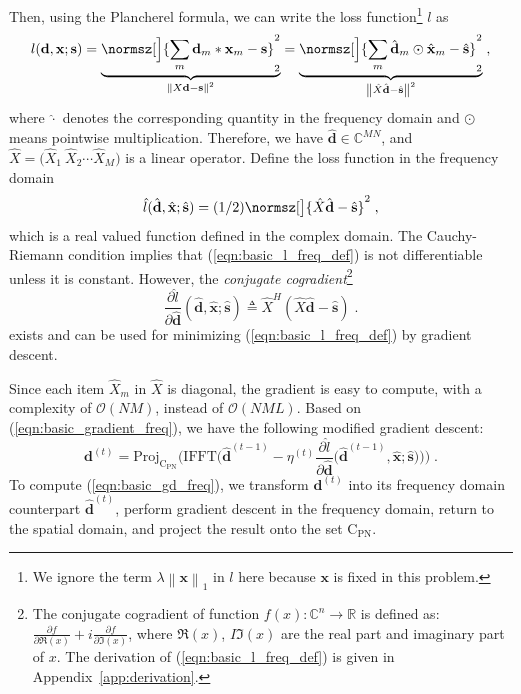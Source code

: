 \documentclass[final]{siamart1116}
\newcommand{\mb}[1]{\mathbf{#1}}
\providecommand{\norm}[1]{\left\lVert#1\right\rVert}
\def \co {\mathcal{O}}
\def \R  {\mathbb{R}}
\def \C  {\mathbb{C}}
\begin{document}
Then, using the Plancherel formula, we can write the loss function\footnote{We ignore the term $\lambda\norm{\mb{x}}_1$ in $l$ here because $\mb{x}$ is fixed in this problem.} $l$ as
\vspace{-1mm}
\begin{equation}
\label{eqn:basic_l_freq}
l(\mb{d},\mb{x};\mb{s}) = \underbrace{ \normsz[\Big]{\sum_m \mb{d}_m \ast \mb{x}_{m} - \mb{s}}_2^2}_{\norm{X\mb{d} - \mb{s}}^2} = \underbrace{\normsz[\Big]{\sum_m \hat{\mb{d}}_m \odot \hat{\mb{x}}_{m} - \hat{\mb{s}}}_2^2}_{\norm{\hat{X}\hat{\mb{d}} - \hat{\mb{s}}}^2} \;,
\vspace{-1mm}
\end{equation}
where $\hat{\cdot}$ denotes the corresponding quantity in the frequency domain and $\odot$ means pointwise multiplication. Therefore, we have $\hat{\mb{d}} \in \C^{MN}$, and $\hat{X}=\big(\hat{X}_{1}~\hat{X}_{2}\cdots \hat{X}_{M}\big)$ is a linear operator. Define the loss function in the frequency domain
\vspace{-1mm}
\begin{equation}
\label{eqn:basic_l_freq_def}
\hat{l}(\hat{\mb{d}},\hat{\mb{x}};\hat{\mb{s}})  = (1/2) \normsz[\big]{\hat{X}\hat{\mb{d}} - \hat{\mb{s}}}^2 \;,
\vspace{-1mm}
\end{equation}
which is a real valued function defined in the complex domain.
The Cauchy-Riemann condition \cite{ahlfors1953complex} implies that (\ref{eqn:basic_l_freq_def}) is not differentiable unless it is constant. However, the \emph{conjugate cogradient}\footnote{The conjugate cogradient of function $f(x):\C^n\to\R$ is defined as: $\frac{\partial f}{\partial \Re(x)} + i \frac{\partial f}{\partial \Im(x)}$, where $\Re(x)$, $I\Im(x)$ are the real part and imaginary part of $x$. The derivation of (\ref{eqn:basic_l_freq_def}) is given in Appendix~\ref{app:derivation}.}~\cite{sorber2012unconstrained}
\begin{equation}
\label{eqn:basic_gradient_freq}
\frac{\partial \hat{l}}{\partial \hat{\mb{d}}}(\hat{\mb{d}},\hat{\mb{x}};\hat{\mb{s}}) \triangleq \hat{X}^H(\hat{X} \hat{\mb{d}} - \hat{\mb{s}}) \;.
\end{equation}
exists and can be used for minimizing (\ref{eqn:basic_l_freq_def}) by gradient descent.

Since each item $\hat{X}_m$ in $\hat{X}$ is diagonal, the gradient is easy to compute, with a complexity of $\co(NM)$, instead of $\co(NML)$. Based on (\ref{eqn:basic_gradient_freq}), we have the following modified gradient descent:
\begin{equation}
\label{eqn:basic_gd_freq}
\mb{d}^{(t)} = \text{Proj}_{\text{C}_\text{PN}}\bigg(\text{IFFT}\Big(\hat{\mb{d}}^{(t-1)} - \eta^{(t)}\frac{\partial \hat{l}}{\partial \hat{\mb{d}}}\big(\hat{\mb{d}}^{(t-1)},\hat{\mb{x}}; \hat{\mb{s}}\big) \Big)\bigg) \;.
\end{equation}
To compute (\ref{eqn:basic_gd_freq}), we transform $\mb{d}^{(t)}$ into its frequency domain counterpart $\hat{\mb{d}}^{(t)}$, perform gradient descent in the frequency domain, return to the spatial domain, and project the result onto the set $\text{C}_\text{PN}$.
\end{document}
